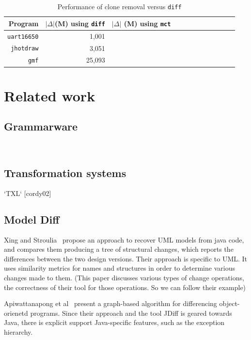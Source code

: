 \documentclass[10pt, conference, compsocconf]{IEEEtran}
\begin{document}
{\begin{table}\centering
\caption{Performance of clone removal versus {\tt diff}\label{table:3}}
\begin{tabular}{| r || r | r || r | r | r || r| r|  r || r | r | r |}\hline
{\bf Program} & \footnotesize  $|\Delta|$(M) using {\tt diff} & \footnotesize $|\Delta|$ (M) using {\tt mct}  \\  \hline\hline
{\tt uart16650} & 1,001 &\\\hline
{\tt jhotdraw} & 3,051 &\\\hline
{\tt gmf} & 25,093 &\\\hline
\hline\end{tabular}
\end{table}


\section{Related work}\label{sec:related}
\subsection{Grammarware}
 
~\cite{klint05tosem}
   
\subsection{Transformation systems}

   `TXL` [cordy02]
   
\subsection{Model Diff}
Xing and Stroulia~\cite{xing05ase} propose an approach to recover UML models from java code, and compares them producing a tree of structural changes, which reports the differences between the
two design versions.  Their approach is specific to UML. It uses similarity metrics for names and structures in order to determine various changes made to them. (This paper discusses various types of change operations, the correctness of their tool for those operations. So we can follow their example)

Apiwattanapong et al~\cite{Apiwattanapong:2004:DAO:1025115.1025202} present a graph-based algorithm for differencing object-orienetd programs. Since their approach and the tool JDiff is geared towards Java, there is explicit support Java-specific features, such as the exception hierarchy.



}
\end{document}
